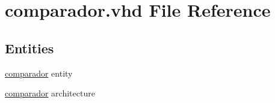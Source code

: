 \hypertarget{comparador_8vhd}{}\section{comparador.\+vhd File Reference}
\label{comparador_8vhd}
\subsection*{Entities}
\begin{DoxyCompactItemize}
\item 
\hyperlink{classcomparador}{comparador} entity
\item 
\hyperlink{classcomparador_1_1comparador}{comparador} architecture
\end{DoxyCompactItemize}
